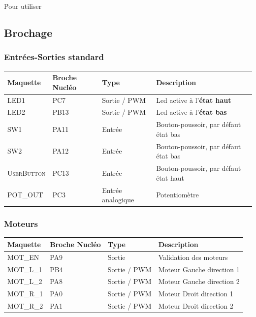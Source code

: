 \documentclass[a4paper,11pt,titlepage]{article} %
\begin{document}
\medskip

Pour utiliser

\subsection{Brochage}

\subsubsection{Entrées-Sorties standard}

\begin{center}
\begin{tabular}{|l|l|l|l|}
\hline 
Maquette & \textbf{Broche Nucléo} & Type & Description \\ 
\hline 
\textsc{LED1} & PC7 & Sortie / PWM & Led active à l'\textbf{état haut}\\ 
\textsc{LED2} & PB13 & Sortie / PWM & Led active à l'\textbf{état bas}\\ 
\hline 
\textsc{SW1} & PA11 & Entrée & Bouton-poussoir, par défaut état bas\\ 
\textsc{SW2} & PA12 & Entrée & Bouton-poussoir, par défaut état bas\\ 
\textsc{UserButton} & PC13 & Entrée & Bouton-poussoir, par défaut état haut\\
\hline  
\textsc{POT\_OUT} & PC3 & Entrée analogique & Potentiomètre\\
\hline  
\end{tabular} 
\end{center}

\subsubsection{Moteurs}

\begin{center}
\begin{tabular}{|l|l|l|l|}
\hline 
Maquette & \textbf{Broche Nucléo} & Type & Description \\ 
\hline 
\textsc{MOT\_EN} & PA9 & Sortie & Validation des moteurs\\ 
\hline 
\textsc{MOT\_L\_1} & PB4 & Sortie / PWM & Moteur Gauche direction 1\\ 
\textsc{MOT\_L\_2} & PA8 & Sortie / PWM & Moteur Gauche direction 2\\ 
\hline 
\textsc{MOT\_R\_1} & PA0 & Sortie / PWM & Moteur Droit direction 1\\ 
\textsc{MOT\_R\_2} & PA1 & Sortie / PWM & Moteur Droit direction 2\\ 
\hline  
\end{tabular} 
\end{center}
\end{document}
